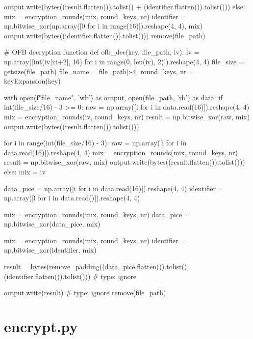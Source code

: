 \begin{python}
            output.write(bytes((result.flatten()).tolist() + (identifier.flatten()).tolist()))
        else:
            mix = encryption_rounds(mix, round_keys, nr)
            identifier = np.bitwise_xor(np.array([0 for i in range(16)]).reshape(4, 4), mix)
            output.write(bytes((identifier.flatten()).tolist()))
    remove(file_path)


# OFB decryption function
def ofb_dec(key, file_path, iv):
    iv = np.array([int(iv[i:i+2], 16) for i in range(0, len(iv), 2)]).reshape(4, 4)
    file_size = getsize(file_path)
    file_name = file_path[:-4]
    round_keys, nr = keyExpansion(key)

    with open(f"{file_name}", 'wb') as output, open(file_path, 'rb') as data:
        if int(file_size/16) - 3 >= 0:
            raw = np.array([i for i in data.read(16)]).reshape(4, 4)
            mix = encryption_rounds(iv, round_keys, nr)
            result = np.bitwise_xor(raw, mix)
            output.write(bytes((result.flatten()).tolist()))

            for i in range(int(file_size/16) - 3):
                raw = np.array([i for i in data.read(16)]).reshape(4, 4)
                mix = encryption_rounds(mix, round_keys, nr)
                result = np.bitwise_xor(raw, mix)
                output.write(bytes((result.flatten()).tolist()))
        else:
            mix = iv

        data_pice = np.array([i for i in data.read(16)]).reshape(4, 4)
        identifier = np.array([i for i in data.read()]).reshape(4, 4)

        mix = encryption_rounds(mix, round_keys, nr)
        data_pice = np.bitwise_xor(data_pice, mix)

        mix = encryption_rounds(mix, round_keys, nr)
        identifier = np.bitwise_xor(identifier, mix)

        result = bytes(remove_padding((data_pice.flatten()).tolist(), (identifier.flatten()).tolist()))  # type: ignore

        output.write(result)  # type: ignore
    remove(file_path)

\end{python}

\section{encrypt.py}
\label{app:encrypt.py}

